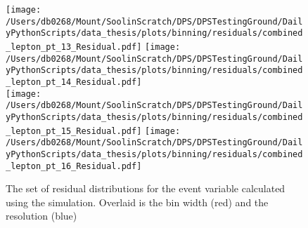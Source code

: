 \begin{figure}[htpb]
	\texttt{[image: /Users/db0268/Mount/SoolinScratch/DPS/DPSTestingGround/DailyPythonScripts/data\_thesis/plots/binning/residuals/combined\_lepton\_pt\_13\_Residual.pdf]}
	\texttt{[image: /Users/db0268/Mount/SoolinScratch/DPS/DPSTestingGround/DailyPythonScripts/data\_thesis/plots/binning/residuals/combined\_lepton\_pt\_14\_Residual.pdf]} \\
	\texttt{[image: /Users/db0268/Mount/SoolinScratch/DPS/DPSTestingGround/DailyPythonScripts/data\_thesis/plots/binning/residuals/combined\_lepton\_pt\_15\_Residual.pdf]}
	\texttt{[image: /Users/db0268/Mount/SoolinScratch/DPS/DPSTestingGround/DailyPythonScripts/data\_thesis/plots/binning/residuals/combined\_lepton\_pt\_16\_Residual.pdf]}
	\caption[The set of residual distributions for the \LPT{} event variable calculated using the \powhegpythia{} simulation. Overlaid is the bin width (red) and the resolution (blue)]{The set of residual distributions for the \LPT{} event variable calculated using the \powhegpythia{} simulation. Overlaid is the bin width (red) and the resolution (blue)}
	\label{fig:ResLPT}
\end{figure}
